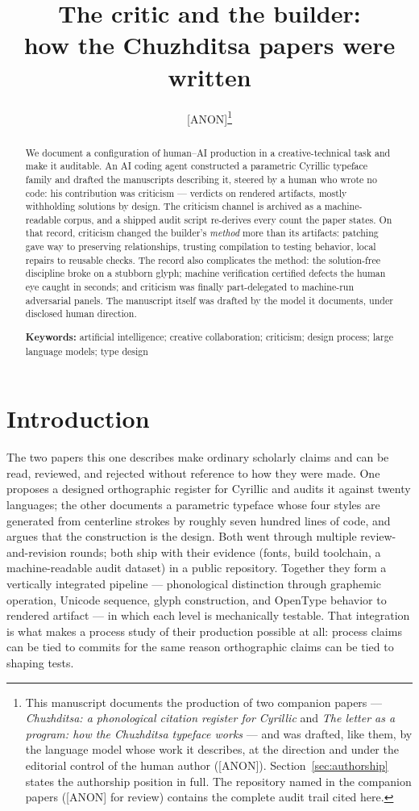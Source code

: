\documentclass[12pt]{article}
\title{\textbf{The critic and the builder:\\ how the Chuzhditsa papers were written}}
\author{{\normalsize [ANON]}\thanks{This manuscript documents the production of two companion papers — \emph{Chuzhditsa: a phonological citation register for Cyrillic} and \emph{The letter as a program: how the Chuzhditsa typeface works} — and was drafted, like them, by the language model whose work it describes, at the direction and under the editorial control of the human author ([ANON]). Section~\ref{sec:authorship} states the authorship position in full. The repository named in the companion papers ([ANON] for review) contains the complete audit trail cited here.}}
\date{}
\begin{document}
\maketitle
\onehalfspacing

\begin{abstract}
\noindent We document a configuration of human--AI production in a creative-technical task and make it auditable. An AI coding agent constructed a parametric Cyrillic typeface family and drafted the manuscripts describing it, steered by a human who wrote no code: his contribution was criticism — verdicts on rendered artifacts, mostly withholding solutions by design. The criticism channel is archived as a machine-readable corpus, and a shipped audit script re-derives every count the paper states. On that record, criticism changed the builder's \emph{method} more than its artifacts: patching gave way to preserving relationships, trusting compilation to testing behavior, local repairs to reusable checks. The record also complicates the method: the solution-free discipline broke on a stubborn glyph; machine verification certified defects the human eye caught in seconds; and criticism was finally part-delegated to machine-run adversarial panels. The manuscript itself was drafted by the model it documents, under disclosed human direction.

\medskip
\noindent\textbf{Keywords:} artificial intelligence; creative collaboration; criticism; design process; large language models; type design
\end{abstract}

\section{Introduction}

The two papers this one describes make ordinary scholarly claims and can be read, reviewed, and rejected without reference to how they were made. One proposes a designed orthographic register for Cyrillic and audits it against twenty languages; the other documents a parametric typeface whose four styles are generated from centerline strokes by roughly seven hundred lines of code, and argues that the construction is the design. Both went through multiple review-and-revision rounds; both ship with their evidence (fonts, build toolchain, a machine-readable audit dataset) in a public repository. Together they form a vertically integrated pipeline — phonological distinction through graphemic operation, Unicode sequence, glyph construction, and OpenType behavior to rendered artifact — in which each level is mechanically testable. That integration is what makes a process study of their production possible at all: process claims can be tied to commits for the same reason orthographic claims can be tied to shaping tests.
\end{document}
